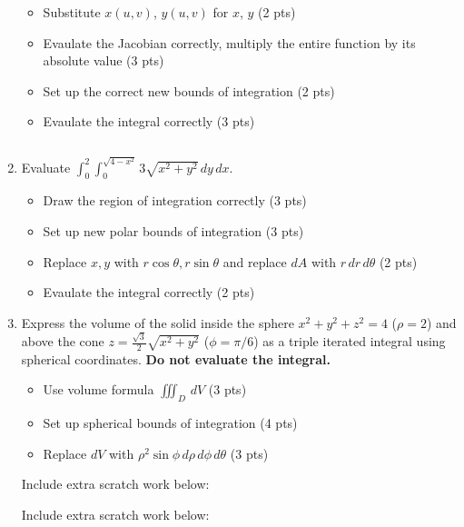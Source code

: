 \documentclass[12pt]{article}
\newcommand{\up}{$~$\vspace*{-0.7in}}
\newcommand{\liner}{\noindent\underline{\hspace*{7in}}}
\newcommand{\ds}{\displaystyle}
\begin{document}
\begin{enumerate}
  \begin{itemize}
  \item Substitute $x(u,v)$, $y(u,v)$ for $x$, $y$ (2 pts)
  \item Evaulate the Jacobian correctly, multiply the entire function by its absolute value (3 pts)
  \item Set up the correct new bounds of integration (2 pts)
  \item Evaulate the integral correctly (3 pts)
  \end{itemize}

\vspace*{7in}

\liner

\newpage\up


\item Evaluate $\ds\int_{0}^2\int_0^{\sqrt{4-x^2}} 3\sqrt{x^2+y^2}\,dy\,dx$.

  \begin{itemize}
  \item Draw the region of integration correctly (3 pts)
  \item Set up new polar bounds of integration (3 pts)
  \item Replace $x,y$ with $r\cos\theta,r\sin\theta$ and replace $dA$ with $r\,dr\,d\theta$ (2 pts)
  \item Evaulate the integral correctly (2 pts)
  \end{itemize}

\vspace*{7.6in}

\liner

\newpage


\item Express the volume of the solid inside the sphere $x^2+y^2+z^2=4$ ($\rho=2$) and above the cone $z=\frac{\sqrt{3}}{2}\sqrt{x^2+y^2}$ ($\phi=\pi/6$) as a triple iterated integral using spherical coordinates. \textbf{Do not evaluate the integral.}

  \begin{itemize}
  \item Use volume formula $\iiint_D \,dV$ (3 pts)
  \item Set up spherical bounds of integration (4 pts)
  \item Replace $dV$ with $\rho^2\sin\phi\,d\rho\,d\phi\,d\theta$ (3 pts)
  \end{itemize}

\vspace*{7in}

\liner

\newpage

\centerline{Include extra scratch work below:}
\liner
\newpage
\centerline{Include extra scratch work below:}
\liner

\end{enumerate}
\end{document}
